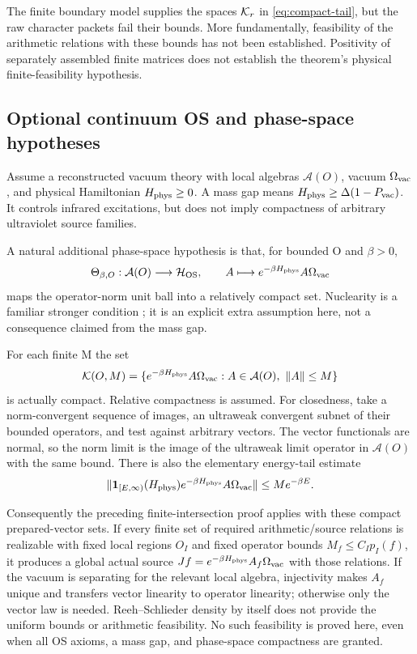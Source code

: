 The finite boundary model supplies the spaces $\mathcal K_r$ in
\eqref{eq:compact-tail}, but the raw character packets fail
their bounds. More fundamentally, feasibility of the
arithmetic relations with these bounds has not been
established. Positivity of separately assembled finite
matrices does not establish the theorem's physical
finite-feasibility hypothesis.

\subsection{Optional continuum OS and phase-space hypotheses}
Assume a reconstructed vacuum theory with local algebras
$\mathcal A(O)$, vacuum $\Omega_{\rm vac}$, and physical
Hamiltonian $H_{\rm phys}\ge0$. A mass gap means
$H_{\rm phys}\ge\Delta(1-P_{\rm vac})$. It controls infrared
excitations, but does not imply compactness of arbitrary
ultraviolet source families.

A natural additional phase-space hypothesis is that, for
bounded O and $\beta>0$,
\begin{equation}
\Theta_{\beta,O}:\mathcal A(O)\longrightarrow\mathcal H_{\rm OS},
\qquad A\longmapsto e^{-\beta H_{\rm phys}}A\Omega_{\rm vac}
\end{equation}
maps the operator-norm unit ball into a relatively compact
set. Nuclearity is a familiar stronger condition
\cite{buchholz-wichmann}; it is an explicit extra assumption
here, not a consequence claimed from the mass gap.

For each finite M the set
\begin{equation}
\mathcal K(O,M)=
\{e^{-\beta H_{\rm phys}}A\Omega_{\rm vac}:
                A\in\mathcal A(O),\ \lVert A\rVert\le M\}
\end{equation}
is actually compact. Relative compactness is assumed.
For closedness, take a norm-convergent sequence of images,
an ultraweak convergent subnet of their bounded operators,
and test against arbitrary vectors. The vector functionals
are normal, so the norm limit is the image of the ultraweak
limit operator in $\mathcal A(O)$ with the same bound.
There is also the elementary energy-tail estimate
\begin{equation}
\lVert \mathbf1_{[E,\infty)}(H_{\rm phys})
          e^{-\beta H_{\rm phys}}A\Omega_{\rm vac}\rVert
\le Me^{-\beta E}.
\end{equation}

Consequently the preceding finite-intersection proof applies
with these compact prepared-vector sets. If every finite
set of required arithmetic/source relations is realizable
with fixed local regions $O_I$ and fixed operator bounds
$M_f\le C_Ip_I(f)$, it produces a global actual source
$Jf=e^{-\beta H_{\rm phys}}A_f\Omega_{\rm vac}$ with those
relations. If the vacuum is separating for the relevant
local algebra, injectivity makes $A_f$ unique and transfers
vector linearity to operator linearity; otherwise only the
vector law is needed. Reeh--Schlieder density by itself
does not provide the uniform bounds or arithmetic
feasibility. No such feasibility is proved here, even
when all OS axioms, a mass gap, and phase-space compactness
are granted.
